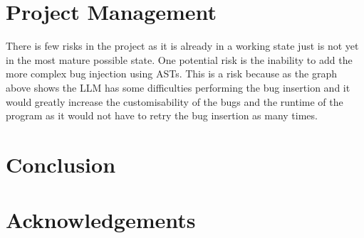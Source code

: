 \documentclass[12pt]{extarticle}
\begin{document}
\section{Project Management}

There is few risks in the project as it is already in a working state just is not yet in the most mature possible state. One potential risk is the inability to add the more complex bug injection using ASTs. This is a risk because as the graph above shows the LLM has some difficulties performing the bug insertion and it would greatly increase the customisability of the bugs and the runtime of the program as it would not have to retry the bug insertion as many times.\\


\section{Conclusion}

\section{Acknowledgements}
\end{document}
